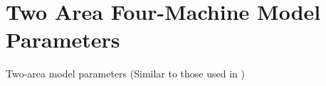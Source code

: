 \documentclass[journal]{IEEEtran}
\begin{document}

%


\appendices
\section{Two Area Four-Machine Model Parameters\label{LiiteC}}

Two-area model parameters (Similar to those used in \cite{KundurTwoArea})\\
\end{document}
